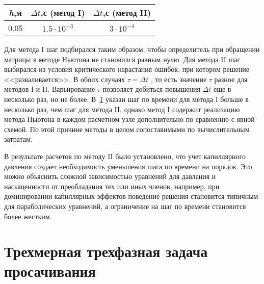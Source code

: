 \begin{table}[h]
\begin{center}
\begin{tabular}{|c|c|c|}
\hline
\textit {h},м & $\Delta t$,с (метод I) & $\Delta t$,с (метод II) \\
\hline
0.05 & $1.5\cdot10^{-3}$ & $3\cdot10^{-4}$ \\
\hline
\end{tabular}
\label{tabular:limits}
\end{center}
\end{table}

Для метода I шаг подбирался таким образом, чтобы определитель при обращении матрицы в методе
Ньютона не становился равным нулю. Для метода II шаг выбирался из
условия критического нарастания ошибок, при котором решение <<разваливается>>.
В обоих случаях $\tau=\Delta t$ , то есть значение $\tau$ разное для методов I и II. Варьирование $\tau$ позволяет добиться
повышения $\Delta t$ еще в несколько раз, но не более.
В~\ref{tabular:limits} указан шаг
по времени для метода I больше в несколько раз, чем шаг для метода II, однако
метод I содержит реализацию метода Ньютона в каждом расчетном узле дополнительно по сравнению с явной схемой. По этой причине методы в целом сопоставимыми по вычислительным затратам.

В результате расчетов по методу II было установлено, что учет капиллярного
давления создает необходимость уменьшения шага по времени на порядок. Это можно объяснить сложной зависимостью уравнений для давления и насыщенности от преобладания тех или иных членов, например, при
доминировании капиллярных эффектов поведение решения становится типичным для
параболических уравнений, а ограничение на шаг по времени становится более жестким. 

\section{Трехмерная трехфазная задача просачивания} \label{ch:ch3/sect3}

